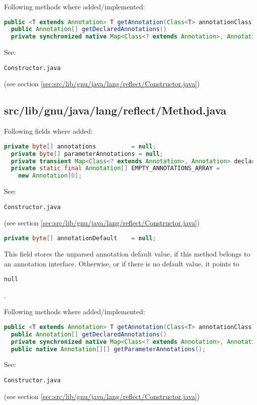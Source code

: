 \documentclass[a4paper, 10pt, titlepage]{scrartcl} %
\begin{document}
Following methods where added/implemented:
\begin{lstlisting}[language=Java]
  public <T extends Annotation> T getAnnotation(Class<T> annotationClass)
  public Annotation[] getDeclaredAnnotations()
  private synchronized native Map<Class<? extends Annotation>, Annotation> declaredAnnotations();
\end{lstlisting}
See: \begin{scriptsize}\verb|Constructor|\hspace{0.0pt}\verb|.|\hspace{0.0pt}\verb|java|\end{scriptsize} (see section \ref{sec:src/lib/gnu/java/lang/reflect/Constructor.java})

\subsection{src/lib/gnu/java/lang/reflect/Method.java}
\label{sec:src/lib/gnu/java/lang/reflect/Method.java}

Following fields where added:
\begin{lstlisting}[language=Java]
  private byte[] annotations          = null;
  private byte[] parameterAnnotations = null;
  private transient Map<Class<? extends Annotation>, Annotation> declaredAnnotations = null;
  private static final Annotation[] EMPTY_ANNOTATIONS_ARRAY =
    new Annotation[0];
\end{lstlisting}
See: \begin{scriptsize}\verb|Constructor|\hspace{0.0pt}\verb|.|\hspace{0.0pt}\verb|java|\end{scriptsize} (see section \ref{sec:src/lib/gnu/java/lang/reflect/Constructor.java})

\begin{lstlisting}[language=Java]
  private byte[] annotationDefault    = null;
\end{lstlisting}
This field stores the unparsed annotation default value, if this method belongs
to an annotation interface. Otherwise, or if there is no default value, it
points to \begin{scriptsize}\verb|null|\end{scriptsize}.

Following methods where added/implemented:
\begin{lstlisting}[language=Java]
  public <T extends Annotation> T getAnnotation(Class<T> annotationClass)
  public Annotation[] getDeclaredAnnotations()
  private synchronized native Map<Class<? extends Annotation>, Annotation> declaredAnnotations();
  public native Annotation[][] getParameterAnnotations();
\end{lstlisting}
See: \begin{scriptsize}\verb|Constructor|\hspace{0.0pt}\verb|.|\hspace{0.0pt}\verb|java|\end{scriptsize} (see section \ref{sec:src/lib/gnu/java/lang/reflect/Constructor.java})
\end{document}
